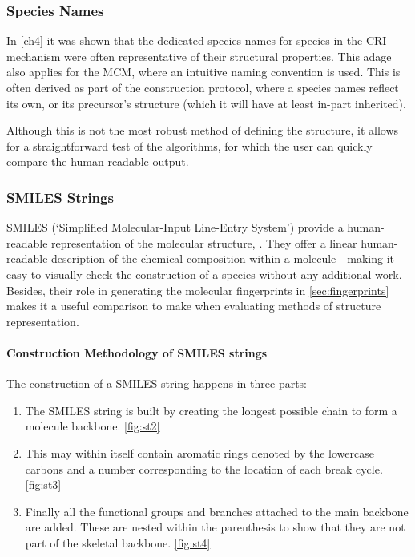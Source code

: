 \subsubsection{Species Names}
In \autoref{ch4} it was shown that the dedicated species names for species in the CRI mechanism were often representative of their structural properties. This adage also applies for the MCM, where an intuitive naming convention is used. This is often derived as part of the construction protocol, where a species names reflect its own, or its precursor's structure (which it will have at least in-part inherited).

Although this is not the most robust method of defining the structure, it allows for a straightforward test of the algorithms, for which the user can quickly compare the human-readable output.


\subsubsection{SMILES Strings}\label{sec:SMILES}


 SMILES (`Simplified Molecular-Input Line-Entry System') provide a human-readable representation of the molecular structure,
 \citep{SMILES}. They offer a linear human-readable description of the chemical composition within a molecule - making it easy to visually check the construction of a species without any additional work. Besides, their role in generating the molecular fingerprints in \autoref{sec:fingerprints} makes it a useful comparison to make when evaluating methods of structure representation.

\paragraph*{Construction Methodology of SMILES strings}
The construction of a SMILES string happens in three parts:

\begin{enumerate}
    \item The SMILES string is built by creating the longest possible chain to form a molecule backbone.
    \autoref{fig:st2}

    \item This may within itself contain aromatic rings denoted by the lowercase carbons and a number corresponding to the location of each break cycle. \autoref{fig:st3}

    \item Finally all the functional groups and branches attached to the main backbone are added. These are nested within the parenthesis to show that they are not part of the skeletal backbone. \autoref{fig:st4}
\end{enumerate}



